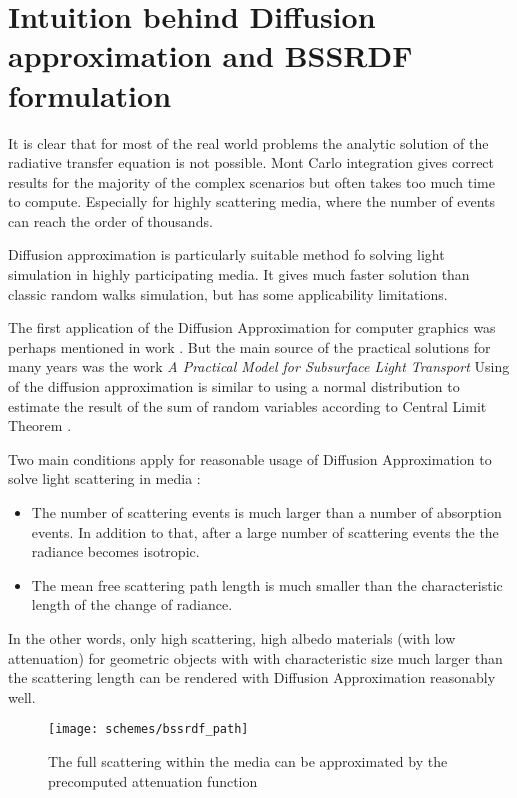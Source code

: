 \section{Intuition behind Diffusion approximation and BSSRDF formulation}
\label{section:BSSRDF_intuition}
It is clear that for most of the real world problems the analytic solution of the radiative transfer
equation is not possible. Mont Carlo integration gives correct results for the majority of the
complex scenarios but often takes too much time to compute. Especially for highly scattering media,
where the number of events can reach the order of thousands.

Diffusion approximation is particularly suitable method fo solving light simulation in highly
participating media. It gives much faster solution than classic random walks simulation, but has
some applicability limitations.

The first application of the Diffusion Approximation for computer graphics was perhaps mentioned in
work \cite{Stam1995}. But the main source of the practical solutions for many years was the work
\emph{A Practical Model for Subsurface Light Transport} \cite{Jensen:2001:PMS:383259.383319} Using
of the diffusion approximation is similar to using a normal distribution to estimate the result of
the sum of random variables according to Central Limit Theorem \cite{Glynn1990145}.

Two main conditions apply for reasonable usage of Diffusion Approximation to solve light scattering
in media \cite{wang2007biomedical}:
\begin{itemize}
  \item The number of scattering events is much larger than a number of absorption events. In
  addition to that, after a large number of scattering events the the radiance becomes isotropic.
  \item The mean free scattering path length is much smaller than the characteristic length of the
  change of radiance.
\end{itemize}

In the other words, only high scattering, high albedo materials (with low attenuation) for geometric
objects with with characteristic size much larger than the scattering length can be rendered with
Diffusion Approximation reasonably well.

\begin{figure}[h]
    \centering
    \texttt{[image: schemes/bssrdf\_path]}
    \caption{The full scattering within the media can be approximated by the precomputed attenuation
    function}
    \label{fig:bssrdf_path}
\end{figure}


